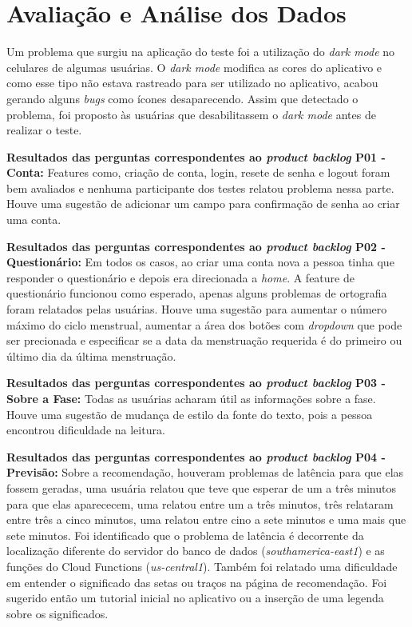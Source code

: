 \section{Avaliação e Análise dos Dados}



Um problema que surgiu na aplicação do teste foi a utilização do \emph{dark mode} no celulares de algumas usuárias. O \emph{dark mode} 
modifica as cores do aplicativo e como esse tipo não estava rastreado para ser utilizado no aplicativo, acabou gerando alguns \emph{bugs} 
como ícones desaparecendo. Assim que detectado o problema, foi proposto às usuárias que desabilitassem o \emph{dark mode} antes de realizar o teste.

\textbf{Resultados das perguntas correspondentes ao \emph{product backlog} P01 - Conta:} Features como, criação de conta, login, resete de 
senha e logout foram bem avaliados e nenhuma participante dos testes relatou problema nessa parte. 
Houve uma sugestão de adicionar um campo para confirmação de senha ao criar uma conta.


\textbf{Resultados das perguntas correspondentes ao \emph{product backlog} P02 - Questionário:} Em todos os casos, ao criar uma conta nova a pessoa tinha que responder o 
questionário e depois era direcionada a \emph{home}. A feature de questionário 
funcionou como esperado, apenas alguns problemas de ortografia foram relatados pelas usuárias. Houve uma sugestão para aumentar o 
número máximo do ciclo menstrual, aumentar a área dos botões com \emph{dropdown} que pode ser precionada e especificar se a 
data da menstruação requerida é do 
primeiro ou último dia da última menstruação.

\textbf{Resultados das perguntas correspondentes ao \emph{product backlog} P03 - Sobre a Fase:} Todas as usuárias acharam útil as informações 
sobre a fase. Houve uma sugestão de mudança de estilo da fonte do texto, pois a pessoa encontrou dificuldade na leitura.


\textbf{Resultados das perguntas correspondentes ao \emph{product backlog} P04 - Previsão:} Sobre a recomendação, houveram 
problemas de latência para que elas fossem geradas, uma usuária relatou que teve que esperar de um a três 
minutos para que elas aparececem, uma relatou entre um a três minutos, três relataram entre três a cinco minutos, uma 
relatou entre cino a sete minutos e uma mais que sete minutos. Foi identificado que o problema de latência é 
decorrente da localização diferente do servidor do banco de dados (\emph{southamerica-east1}) e as 
funções do Cloud Functions (\emph{us-central1}). Também foi relatado 
uma dificuldade em entender o significado das setas ou traços na página de recomendação. Foi sugerido 
então um tutorial inicial no aplicativo ou a inserção de uma legenda sobre os significados.

